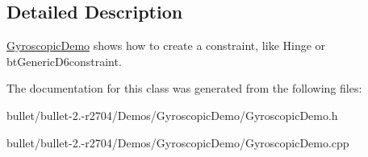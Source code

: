 \subsection{Detailed Description}
\hyperlink{class_gyroscopic_demo}{Gyroscopic\+Demo} shows how to create a constraint, like Hinge or bt\+Generic\+D6constraint. 

The documentation for this class was generated from the following files\+:\begin{DoxyCompactItemize}
\item 
bullet/bullet-\/2.-\/r2704/\+Demos/\+Gyroscopic\+Demo/Gyroscopic\+Demo.\+h\item 
bullet/bullet-\/2.-\/r2704/\+Demos/\+Gyroscopic\+Demo/Gyroscopic\+Demo.\+cpp\end{DoxyCompactItemize}
